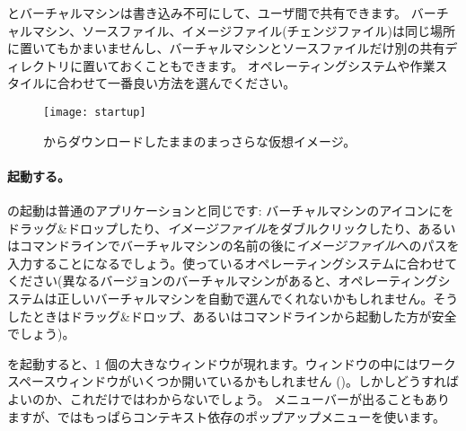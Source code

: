 \documentclass[a4paper,10pt,twoside]{book}
\begin{document}
とバーチャルマシンは書き込み不可にして、ユーザ間で共有できます。
バーチャルマシン、ソースファイル、イメージファイル(チェンジファイル)は同じ場所に置いてもかまいませんし、バーチャルマシンとソースファイルだけ別の共有ディレクトリに置いておくこともできます。
オペレーティングシステムや作業スタイルに合わせて一番良い方法を選んでください。


\begin{figure}[htb]
\centerline {\texttt{[image: startup]}}
\caption{\pbe からダウンロードしたままのまっさらな仮想イメージ。}
\end{figure}

\paragraph{起動する。} \pharo の起動は普通のアプリケーションと同じです: バーチャルマシンのアイコンにをドラッグ\&ドロップしたり、\emph{イメージファイル}をダブルクリックしたり、あるいはコマンドラインでバーチャルマシンの名前の後に\emph{イメージファイル}へのパスを入力することになるでしょう。使っているオペレーティングシステムに合わせてください(異なるバージョンのバーチャルマシンがあると、オペレーティングシステムは正しいバーチャルマシンを自動で選んでくれないかもしれません。そうしたときはドラッグ\&ドロップ、あるいはコマンドラインから起動した方が安全でしょう)。

\pharo を起動すると、1 個の大きなウィンドウが現れます。ウィンドウの中にはワークスペースウィンドウがいくつか開いているかもしれません ()。しかしどうすればよいのか、これだけではわからないでしょう。
メニューバーが出ることもありますが、\pharo ではもっぱらコンテキスト依存のポップアップメニューを使います。

\end{document}
